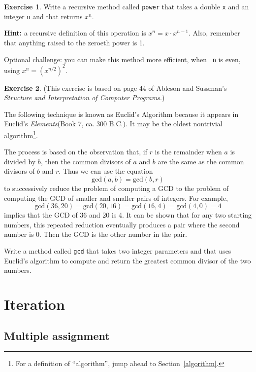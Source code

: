 \documentclass[12pt]{book}
\def\HINT{\textbf{Hint:}}
\theoremstyle{definition}
\newtheorem{excz}{Exercise}[chapter]
\newenvironment{exercise}{\bigskip\begin{excz}\mbox{}}{\end{excz}}
\begin{document}
\begin{exercise}
\label{ex.power}
Write a recursive method called {\tt power} that
takes a double {\tt x} and an integer {\tt n} and that
returns $x^n$.

\HINT{} a recursive definition of this
operation is $x^n = x \cdot x^{n-1}$.
Also, remember that anything raised to the zeroeth power
is 1.

Optional challenge: you can make this method more efficient, when {\tt
  n} is even, using $x^n = \left( x^{n/2} \right)^2$.

\end{exercise}


\begin{exercise}
\label{gcd}
(This exercise is based on page 44 of Ableson and Sussman's
{\em Structure and Interpretation of Computer Programs}.)

The following technique is known as Euclid's Algorithm because
it appears in Euclid's {\em Elements}(Book 7, ca. 300 B.C.).
It may be the oldest nontrivial algorithm\footnote{For a definition
of ``algorithm'', jump ahead to Section~\ref{algorithm}.}.

The process is based on the observation that, if $r$ is the
remainder when $a$ is divided by $b$, then the common divisors
of $a$ and $b$ are the same as the common divisors of $b$ and $r$.
Thus we can use the equation
%
\[ \mathrm{gcd}(a, b) = \mathrm{gcd}(b, r) \]
%
to successively reduce the problem of computing a GCD to the
problem of computing the GCD of smaller and smaller pairs of integers.
For example,
%
\[ \mathrm{gcd}(36, 20) = \mathrm{gcd}(20, 16) = \mathrm{gcd}(16, 4) = \mathrm{gcd}(4, 0) = 4\]
%
implies that the GCD of 36 and 20 is 4.  It can be shown
that for any two starting numbers, this repeated reduction eventually
produces a pair where the second number is 0.  Then the GCD is the
other number in the pair.

Write a method called {\tt gcd} that takes two integer parameters and
that uses Euclid's algorithm to compute and return the greatest
common divisor of the two numbers.
\end{exercise}


\chapter{Iteration}
\label{chap06}

\section{Multiple assignment}
\end{document}
